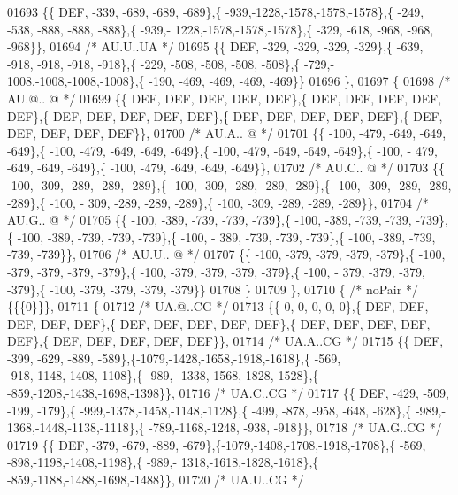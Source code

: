\begin{DoxyCode}
01693 \{\{  DEF, -339, -689, -689, -689\},\{ -939,-1228,-1578,-1578,-1578\},\{ -249, -538, -888, -888, -888\},\{ -939,-
      1228,-1578,-1578,-1578\},\{ -329, -618, -968, -968, -968\}\},
01694 \textcolor{comment}{/* AU.U..UA */}
01695 \{\{  DEF, -329, -329, -329, -329\},\{ -639, -918, -918, -918, -918\},\{ -229, -508, -508, -508, -508\},\{ -729,-
      1008,-1008,-1008,-1008\},\{ -190, -469, -469, -469, -469\}\}
01696 \},
01697 \{
01698 \textcolor{comment}{/* AU.@.. @ */}
01699 \{\{  DEF,  DEF,  DEF,  DEF,  DEF\},\{  DEF,  DEF,  DEF,  DEF,  DEF\},\{  DEF,  DEF,  DEF,  DEF,  DEF\},\{  DEF,  
      DEF,  DEF,  DEF,  DEF\},\{  DEF,  DEF,  DEF,  DEF,  DEF\}\},
01700 \textcolor{comment}{/* AU.A.. @ */}
01701 \{\{ -100, -479, -649, -649, -649\},\{ -100, -479, -649, -649, -649\},\{ -100, -479, -649, -649, -649\},\{ -100, -
      479, -649, -649, -649\},\{ -100, -479, -649, -649, -649\}\},
01702 \textcolor{comment}{/* AU.C.. @ */}
01703 \{\{ -100, -309, -289, -289, -289\},\{ -100, -309, -289, -289, -289\},\{ -100, -309, -289, -289, -289\},\{ -100, -
      309, -289, -289, -289\},\{ -100, -309, -289, -289, -289\}\},
01704 \textcolor{comment}{/* AU.G.. @ */}
01705 \{\{ -100, -389, -739, -739, -739\},\{ -100, -389, -739, -739, -739\},\{ -100, -389, -739, -739, -739\},\{ -100, -
      389, -739, -739, -739\},\{ -100, -389, -739, -739, -739\}\},
01706 \textcolor{comment}{/* AU.U.. @ */}
01707 \{\{ -100, -379, -379, -379, -379\},\{ -100, -379, -379, -379, -379\},\{ -100, -379, -379, -379, -379\},\{ -100, -
      379, -379, -379, -379\},\{ -100, -379, -379, -379, -379\}\}
01708 \}
01709 \},
01710 \{ \textcolor{comment}{/* noPair */} \{\{\{0\}\}\},
01711 \{
01712 \textcolor{comment}{/* UA.@..CG */}
01713 \{\{    0,    0,    0,    0,    0\},\{  DEF,  DEF,  DEF,  DEF,  DEF\},\{  DEF,  DEF,  DEF,  DEF,  DEF\},\{  DEF,  
      DEF,  DEF,  DEF,  DEF\},\{  DEF,  DEF,  DEF,  DEF,  DEF\}\},
01714 \textcolor{comment}{/* UA.A..CG */}
01715 \{\{  DEF, -399, -629, -889, -589\},\{-1079,-1428,-1658,-1918,-1618\},\{ -569, -918,-1148,-1408,-1108\},\{ -989,-
      1338,-1568,-1828,-1528\},\{ -859,-1208,-1438,-1698,-1398\}\},
01716 \textcolor{comment}{/* UA.C..CG */}
01717 \{\{  DEF, -429, -509, -199, -179\},\{ -999,-1378,-1458,-1148,-1128\},\{ -499, -878, -958, -648, -628\},\{ -989,-
      1368,-1448,-1138,-1118\},\{ -789,-1168,-1248, -938, -918\}\},
01718 \textcolor{comment}{/* UA.G..CG */}
01719 \{\{  DEF, -379, -679, -889, -679\},\{-1079,-1408,-1708,-1918,-1708\},\{ -569, -898,-1198,-1408,-1198\},\{ -989,-
      1318,-1618,-1828,-1618\},\{ -859,-1188,-1488,-1698,-1488\}\},
01720 \textcolor{comment}{/* UA.U..CG */}

\end{DoxyCode}

